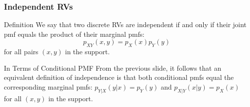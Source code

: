 \documentclass[handout]{beamer}
\begin{document}


\begin{frame}
\frametitle{Independent RVs}


\begin{block}{Definition}
We say that two discrete RVs are \alert{independent} if and only if their joint pmf equals the product of their marginal pmfs: $$p_{XY}(x,y) = p_X(x)p_Y(y)$$ for all pairs $(x,y)$ in the support.
\end{block}


\begin{block}{In Terms of Conditional PMF}
From the previous slide, it follows that an equivalent definition of independence is that both conditional pmfs equal the corresponding marginal pmfs: $p_{Y|X}(y|x) = p_Y(y)$ and  $p_{X|Y}(x|y) = p_X(x)$ for all $(x,y)$ in the support.
\end{block}

\end{frame}
\end{document}
